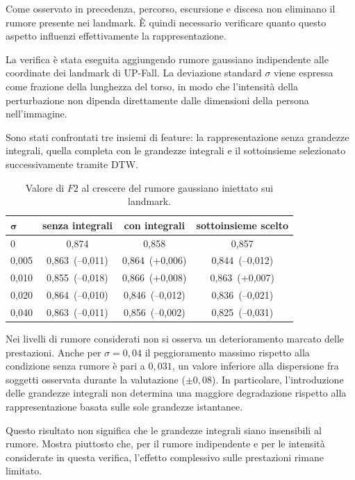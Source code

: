 Come osservato in precedenza, percorso, escursione e discesa non eliminano il rumore presente nei landmark. È quindi necessario verificare quanto questo aspetto influenzi effettivamente la rappresentazione.

La verifica è stata eseguita aggiungendo rumore gaussiano indipendente alle coordinate dei landmark di UP-Fall. La deviazione standard \(\sigma\) viene espressa come frazione della lunghezza del torso, in modo che l'intensità della perturbazione non dipenda direttamente dalle dimensioni della persona nell'immagine.

Sono stati confrontati tre insiemi di feature: la rappresentazione senza grandezze integrali, quella completa con le grandezze integrali e il sottoinsieme selezionato successivamente tramite DTW.

\begin{table}[ht]
\centering
\caption{Valore di \(F2\) al crescere del rumore gaussiano iniettato sui landmark.}
\label{tab:rumore}
\begin{tabular}{lccc}
\toprule
$\boldsymbol{\sigma}$ & \textbf{senza integrali} & \textbf{con integrali} & \textbf{sottoinsieme scelto} \\
\midrule
0     & 0,874 & 0,858 & 0,857 \\
0,005 & 0,863 \,(--0,011) & 0,864 \,(+0,006) & 0,844 \,(--0,012) \\
0,010 & 0,855 \,(--0,018) & 0,866 \,(+0,008) & 0,863 \,(+0,007) \\
0,020 & 0,864 \,(--0,010) & 0,846 \,(--0,012) & 0,836 \,(--0,021) \\
0,040 & 0,863 \,(--0,011) & 0,856 \,(--0,002) & 0,825 \,(--0,031) \\
\bottomrule
\end{tabular}
\end{table}

Nei livelli di rumore considerati non si osserva un deterioramento marcato delle prestazioni. Anche per \(\sigma=0{,}04\) il peggioramento massimo rispetto alla condizione senza rumore è pari a \(0{,}031\), un valore inferiore alla dispersione fra soggetti osservata durante la valutazione (\(\pm 0{,}08\)).
In particolare, l'introduzione delle grandezze integrali non determina una maggiore degradazione rispetto alla rappresentazione basata sulle sole grandezze istantanee.

Questo risultato non significa che le grandezze integrali siano insensibili al rumore. Mostra piuttosto che, per il rumore indipendente e per le intensità considerate in questa verifica, l'effetto complessivo sulle prestazioni rimane limitato.

